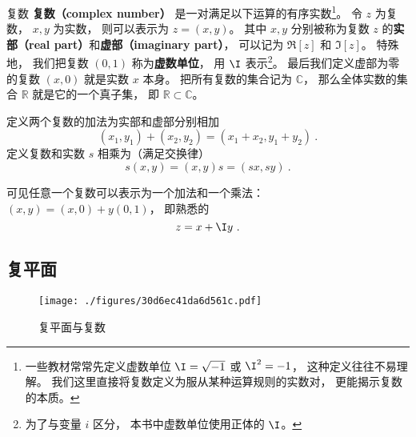 


\begin{definition}{复数}
\textbf{复数（complex number）} 是一对满足以下运算的有序实数\footnote{一些教材常常先定义虚数单位 $\I = \sqrt{-1}$ 或 $\I^2 = -1$， 这种定义往往不易理解。 我们这里直接将复数定义为服从某种运算规则的实数对， 更能揭示复数的本质\cite{Rudin}。}。 令 $z$ 为复数， $x, y$ 为实数， 则可以表示为 $z = (x, y)$。 其中 $x,y$ 分别被称为复数 $z$ 的\textbf{实部（real part）}和\textbf{虚部（imaginary part）}， 可以记为 $\Re[z]$ 和 $\Im[z]$。 特殊地， 我们把复数 $(0, 1)$ 称为\textbf{虚数单位}， 用 $\I$ 表示\footnote{为了与变量 $i$ 区分， 本书中虚数单位使用正体的 $\I$。}。 最后我们定义虚部为零的复数 $(x, 0)$ 就是实数 $x$ 本身。 把所有复数的集合记为 $\mathbb C$， 那么全体实数的集合 $\mathbb R$ 就是它的一个真子集， 即 $\mathbb R \subset \mathbb C$。

定义两个复数的加法为实部和虚部分别相加
\begin{equation}\label{eq_CplxNo_1}
(x_1, y_1) + (x_2, y_2) = (x_1+ x_2, y_1 + y_2)~.
\end{equation}
定义复数和实数 $s$ 相乘为（满足交换律）
\begin{equation}\label{eq_CplxNo_4}
s(x, y) = (x, y)s = (sx, sy)~.
\end{equation}
\end{definition}
可见任意一个复数可以表示为一个加法和一个乘法： $(x, y) = (x, 0) + y(0, 1)$， 即熟悉的
\begin{equation}
z = x + \I y~.
\end{equation}

\subsection{复平面}
\begin{figure}[ht]
\centering
\texttt{[image: ./figures/30d6ec41da6d561c.pdf]}
\caption{复平面与复数} \label{fig_CplxNo_1}
\end{figure}

